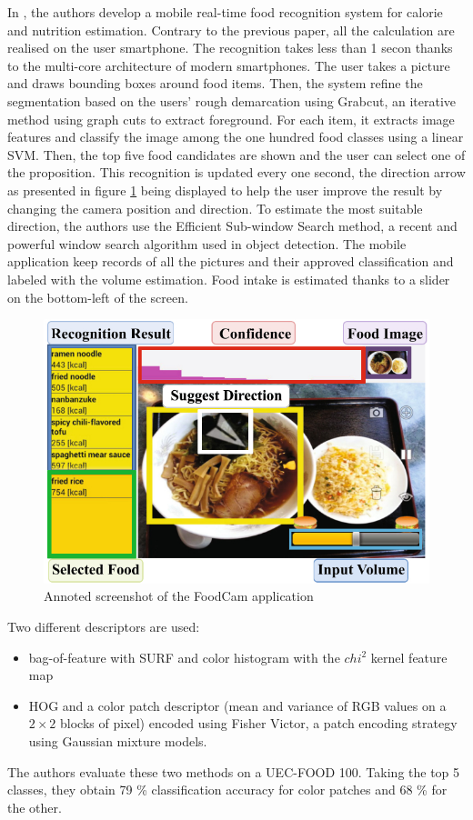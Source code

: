 In \cite{Kawano2014a}, the authors develop a mobile real-time food recognition system for calorie and nutrition estimation. Contrary to the previous paper, all the calculation are realised on the user smartphone. The recognition takes less than 1 secon thanks to the multi-core architecture of modern smartphones.
The user takes a picture and draws bounding boxes around food items. Then, the system refine the segmentation based on the users' rough demarcation using Grabcut, an iterative method using graph cuts to extract foreground.
For each item, it extracts image features and classify the image among the one hundred food classes using a linear SVM. Then, the top five food candidates are shown and the user can select one of the proposition.
This recognition is updated every one second, the direction arrow as presented in figure  \ref{fig:food_cam} being displayed to help the user improve the result by changing the camera position and direction. To estimate the most suitable direction, the authors use the Efficient Sub-window Search method, a recent and powerful window search algorithm used in object detection.
The mobile application keep records of all the pictures and their approved classification and labeled with the volume estimation. Food intake is estimated thanks to a slider on the bottom-left of the screen.

\begin{figure}
    \centering
    \includegraphics[scale=0.6]{img/foodcam.jpg}
    \caption{Annoted screenshot of the FoodCam application}
    \label{fig:food_cam}
\end{figure}

Two different descriptors are used:
\begin{itemize}
    \item bag-of-feature with SURF and color histogram with the $chi^2$ kernel feature map
    \item HOG and a color patch descriptor (mean and variance of RGB values on a $2 \times 2$ blocks of pixel) encoded using Fisher Victor, a patch encoding strategy using Gaussian mixture models.
\end{itemize}
The authors evaluate these two methods on a UEC-FOOD 100. Taking the top 5 classes, they obtain 79 \% classification accuracy for color patches and 68 \% for the other.